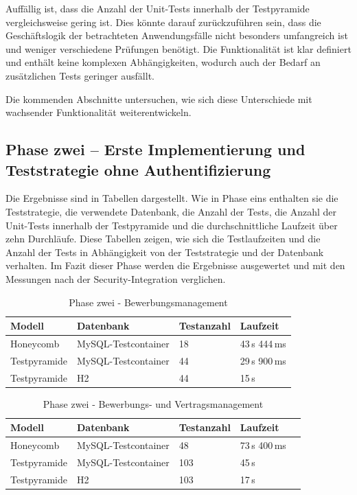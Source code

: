 Auffällig ist, dass die Anzahl der Unit-Tests innerhalb der Testpyramide vergleichsweise gering ist. Dies könnte darauf zurückzuführen sein, dass die Geschäftslogik der betrachteten Anwendungsfälle nicht besonders umfangreich ist und weniger verschiedene Prüfungen benötigt. Die Funktionalität ist klar definiert und enthält keine komplexen Abhängigkeiten, wodurch auch der Bedarf an zusätzlichen Tests geringer ausfällt.

Die kommenden Abschnitte untersuchen, wie sich diese Unterschiede mit wachsender Funktionalität weiterentwickeln.


\subsection{Phase zwei – Erste Implementierung und Teststrategie ohne Authentifizierung}
Die Ergebnisse sind in Tabellen dargestellt. Wie in Phase eins enthalten sie die Teststrategie, die verwendete Datenbank, die Anzahl der Tests, die Anzahl der Unit-Tests innerhalb der Testpyramide und die durchschnittliche Laufzeit über zehn Durchläufe. Diese Tabellen zeigen, wie sich die Testlaufzeiten und die Anzahl der Tests in Abhängigkeit von der Teststrategie und der Datenbank verhalten. Im Fazit dieser Phase werden die Ergebnisse ausgewertet und mit den Messungen nach der Security-Integration verglichen.


\begin{table}[H]
	\centering
	\begin{tabular}{|l|l|l|l|}
		\hline
		\textbf{Modell} & \textbf{Datenbank} & \textbf{Testanzahl} & \textbf{Laufzeit} \\
		\hline
		Honeycomb      & MySQL-Testcontainer & 18  &43\,s 444\,ms    \\
		\hline
				Testpyramide   & MySQL-Testcontainer & 44  & 29\,s 900\,ms \\
				\hline
		Testpyramide   & H2                   & 44 &    15\,s \\
		\hline
	\end{tabular}
	\caption{Phase zwei - Bewerbungsmanagement}
	\label{tab:bewerbungsprozess}
\end{table}


\begin{table}[H]
	\centering
	\begin{tabular}{|l|l|l|l|l|}
		\hline
		\textbf{Modell} & \textbf{Datenbank} & \textbf{Testanzahl}& \textbf{Laufzeit} \\
		\hline
		Honeycomb       & MySQL-Testcontainer & 48  & 73\,s 400\,ms    \\
				\hline
		Testpyramide    & MySQL-Testcontainer & 103        & 45\,s  \\
		\hline
		Testpyramide    & H2                  & 103       & 17\,s  \\
		\hline
	\end{tabular}
		\caption{Phase zwei - Bewerbungs- und Vertragsmanagement}
		\label{tab:vertragsmanagement}
\end{table}

